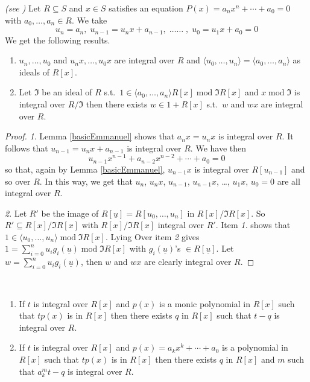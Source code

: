 \documentclass[11pt,a4paper,twoside]{article}
\newcommand \und[1]{\underline{#1}}
\newcommand{\gothic}{\mathfrak}
\newcommand{\fI}{{\gothic I}}
\newcommand\gen[1]{{\langle #1 \rangle}}
\newcommand{\mod}{\;\mathrm{mod}\;}
\begin{document}
\begin{lemma}\label{Emmanuel}\emph{(see \cite{Hallouin})}
Let $R\subseteq S$  and $x\in S$ satisfies an equation $P(x)=a_nx^n+ \cdots + a_0 = 0$
with $a_0,\dots,a_n\in R$. We take 
$$
  u_n = a_n,\; u_{n-1} = u_nx+a_{n-1},\;\dots\dots\;,\;u_0 = u_1x + a_0=0
$$
We get the following results.
%
\begin{enumerate}
%
\item  $u_n,\dots,u_0$ and $u_nx,\dots,u_0x$ are integral over $R$ and
$\gen{u_0,\dots,u_n} = \gen{a_0,\dots,a_n}$ as ideals of $R[x]$.
%
\item Let ${\fI}$ be an ideal of $R$ s.t.\  
 $1\in \gen{a_0,\dots,a_n}R[x] \mod {\fI}R[x]$ and
 $x\mod {\fI}$ is integral over $R/{\fI}$ 
 then there exists $w\in1+R[x]$ s.t.\ 
$w$ and $wx$ are integral over $R$.
%
\end{enumerate}

\end{lemma}

\begin{proof}
\emph{1}. Lemma \ref{basicEmmanuel} shows that $a_nx=u_nx$ is integral over $R$.
 It follows that $u_{n-1} = u_nx + a_{n-1}$ is integral over $R$.
We have then
$$u_{n-1}x^{n-1} + a_{n-2}x^{n-2} + \cdots + a_0 = 0$$
so that, again by Lemma \ref{basicEmmanuel}, $u_{n-1}x$ is integral over $R[u_{n-1}]$ and so over $R$.
In this way, we get that $u_n$, $u_nx$, $u_{n-1}$, $u_{n-1}x$, \dots, $u_1x$, $u_0= 0$ are all integral
over $R$.

\smallskip \noindent \emph{2}. Let $R'$ be the image of $R[\und{u}]=R[u_0,\dots,u_n]$
in $R[x]/{\fI}R[x]$. So $R'\subseteq R[x]/{\fI}R[x]$ with $R[x]/{\fI}R[x]$ integral over $R'$. Item \emph{1.} shows that $1\in \gen{u_0,\dots,u_n} \mod {\fI}R[x]$.
Lying Over item \emph{2} gives $1=\sum_{i=0}^nu_ig_i(\und{u})\mod {\fI}R[x]$ with $g_i(\und{u})$'s $\in R[\und{u}]$. Let $w=\sum_{i=0}^nu_ig_i(\und{u})$, then $w$ and $wx$ are clearly integral over  $R$.
\end{proof}

\begin{lemma} \label{comp} \label{varcomp}~ 
%
\begin{enumerate}
%
\item  If $t$ is integral over $R[x]$ and $p(x)$ is a monic polynomial in 
$R[x]$ such that $tp(x)$ is in $R[x]$ then there exists $q$ in $R[x]$
such that $t-q$ is integral over $R$.

%
\item  If $t$ is integral over $R[x]$ and $p(x)= a_kx^k + \cdots + a_0$ is a polynomial in 
$R[x]$ such that $tp(x)$ is in $R[x]$ then there exists $q$ in $R[x]$ and $m$ 
such that $a_k^mt-q$ is integral over $R$.
%
\end{enumerate}

\end{lemma}
\end{document}
